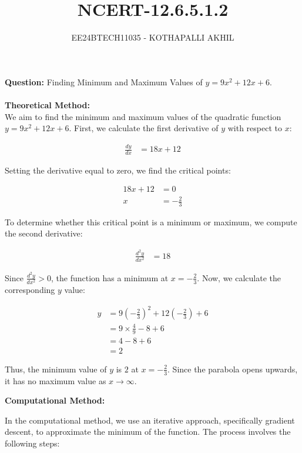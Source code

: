 \documentclass[article]{IEEEtran}
\numberwithin{figure}{enumi}
\begin{document}

\title{NCERT-12.6.5.1.2}
\author{EE24BTECH11035 - KOTHAPALLI AKHIL}
{\let\newpage\relax\maketitle}
\noindent\textbf{Question: }  
Finding Minimum and Maximum Values of $y = 9x^2 + 12x + 6$.\\
\solution \\
\textbf{Theoretical Method:}\\
We aim to find the minimum and maximum values of the quadratic function $y = 9x^2 + 12x + 6$. First, we calculate the first derivative of $y$ with respect to $x$:

\begin{align}
\frac{dy}{dx} &= 18x + 12
\end{align}

Setting the derivative equal to zero, we find the critical points:

\begin{align}
18x + 12 &= 0 \\
x &= -\frac{2}{3}
\end{align}

To determine whether this critical point is a minimum or maximum, we compute the second derivative:

\begin{align}
\frac{d^2y}{dx^2} &= 18
\end{align}

Since $\frac{d^2y}{dx^2} > 0$, the function has a minimum at $x = -\frac{2}{3}$. Now, we calculate the corresponding $y$ value:

\begin{align}
y &= 9\left(-\frac{2}{3}\right)^2 + 12\left(-\frac{2}{3}\right) + 6 \\
&= 9 \times \frac{4}{9} - 8 + 6 \\
&= 4 - 8 + 6 \\
&= 2
\end{align}

Thus, the minimum value of $y$ is $2$ at $x = -\frac{2}{3}$. Since the parabola opens upwards, it has no maximum value as $x \to \infty$.

\textbf{Computational Method:}

In the computational method, we use an iterative approach, specifically gradient descent, to approximate the minimum of the function. The process involves the following steps:
\end{document}
